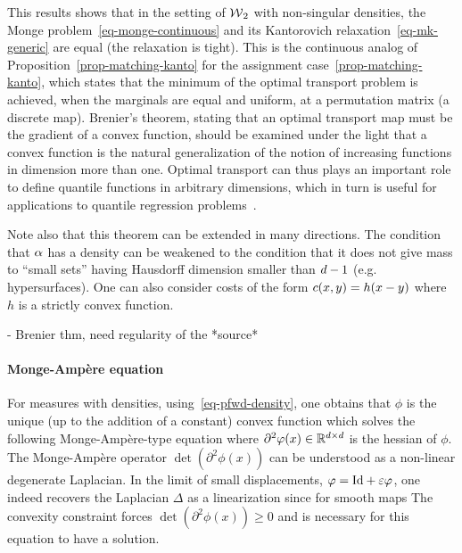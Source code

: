 This results shows that in the setting of $\operatorname{\mathcal{W}}_2$ with non-singular densities, the Monge problem~\eqref{eq-monge-continuous} and its Kantorovich relaxation~\eqref{eq-mk-generic} are equal (the relaxation is tight). This is the continuous analog of Proposition~\ref{prop-matching-kanto} for the assignment case~\eqref{prop-matching-kanto}, which states that the minimum of the optimal transport problem is achieved, when the marginals are equal and uniform, at a permutation matrix (a discrete map).
%
Brenier's theorem, stating that an optimal transport map must be the gradient of a convex function, should be examined under the light that a convex function is the natural generalization of the notion of increasing functions in dimension more than one. Optimal transport can thus plays an important role to define quantile functions in arbitrary dimensions, which in turn is useful for applications to quantile regression problems~\cite{carlier2016vector}.

Note also that this theorem can be extended in many directions. 
% 
The condition that $\alpha$ has a density can be weakened to the condition that it does not give mass to ``small sets'' having Hausdorff dimension smaller than $d-1$ (e.g. hypersurfaces). 
%
One can also consider costs of the form $c(x,y)=h(x-y)$ where $h$ is a strictly convex function. 




- Brenier thm, need regularity of the *source*





\paragraph{Monge-Amp\`ere equation}

For measures with densities, using~\eqref{eq-pfwd-density}, one obtains that $\phi$ is the unique (up to the addition of a constant) convex function which solves the following Monge-Ampère-type equation
where $\partial^2\varphi(x) \in \mathbb{R}^{d \times d}$ is the hessian of $\phi$. The Monge-Amp\`ere operator $\det(\partial^2\phi(x))$ can be understood as a non-linear degenerate Laplacian. In the limit of small displacements, $\varphi=\mathrm{Id} + \varepsilon\varphi$, one indeed recovers the Laplacian $\Delta$ as a linearization since for smooth maps
%
The convexity constraint forces $\det(\partial^2\phi(x)) \geq 0$ and is necessary for this equation to have a solution. 





